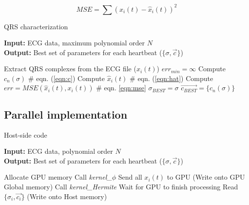 \documentclass[runningheads]{llncs}
\makeatletter
\def\NoNumber#1{{\def\alglinenumber##1{}\State #1}\addtocounter{ALG@line}{-1}}
\makeatother
\begin{document}
\begin{equation}\label{eqn:mse}
MSE = \sum{\left( x_i(t)-\hat{x}_i(t) \right)^2} 
\end{equation}



\begin{algorithm}[h]
\caption{QRS characterization} 
\label{alg:1} 
\textbf{Input:} ECG data, maximum polynomial order $N$ \\
\textbf{Output:} Best set of parameters for each heartbeat ($\{\sigma, \vec{c}\}$) \\
        
\begin{algorithmic}[1]

	 \label{alg:loop1b}
	\ENDFOR \label{alg:loop1e}
	\vspace{3 pt}
	\STATE Extract QRS complexes from the ECG file ($x_i(t)$)
	\vspace{3 pt}
	\STATE $err_{min} = \infty$ \label{alg:loop2b}
			\FORALL{$\sigma$} 
				 \STATE Compute $c_n(\sigma)$ \# eqn. (\ref{eqn:c}) \ENDFOR
				\STATE Compute $\hat{x}_i(t)$ \# eqn. (\ref{eqn:hat})
				\STATE Compute $err=MSE(\hat{x}_i(t), x_i(t))$ \# eqn. \ref{eqn:mse} 
					\STATE $\sigma_{BEST}=\sigma$
					\STATE $\vec{c_{BEST}}=\{c_n(\sigma)\}$ 
				\ENDIF
			\ENDFOR
	\ENDFOR \label{alg:loop2e}

\end{algorithmic}
\end{algorithm} 

\subsection{Parallel implementation}\label{s:parallel}

\begin{algorithm}[h]
\caption{Host-side code} 
\label{alg:host} 
\textbf{Input:} ECG data, polynomial order $N$ \\
\textbf{Output:} Best set of parameters for each heartbeat ($\{\sigma, \vec{c}\}$) \\
        
\begin{algorithmic}[1]
	\STATE Allocate GPU memory
	\STATE Call \textit{kernel\_$\phi$} \label{alg:host_phi}
	\STATE Send all $x_i(t)$ to GPU (Write onto GPU Global memory) \label{alg:host_send}
	\STATE Call \textit{kernel\_Hermite} \label{alg:host_hermite}
	\STATE Wait for GPU to finish processing \label{alg:host_wait}
	\STATE Read $\{\sigma_i , \vec{c_i}\}$ (Write onto Host memory) \label{alg:host_read}
\end{algorithmic}
\end{algorithm} 
\end{document}
